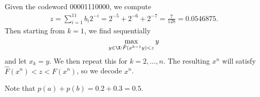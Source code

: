 \documentclass[
  coursecode={MTHE 477},
  assignmentname={Homework \homeworknumber},
  studentnumber=20053722,
  name={Bryan Hoang},
  draft,
  final,
]{
  ltxanswer%
}
\begin{document}
\begin{questions}
\begin{parts}
      \part{}
      \begin{solution}
        Given the codeword 00001110000, we compute
        \begin{align*}
          z = \sum_{i=1}^{11} b_{i} 2^{-i} = 2^{-5} + 2^{-6} + 2^{-7} = \frac{7}{128} = 0.0546875.
        \end{align*}
        Then starting from \(k = 1\), we find sequentially
        \begin{equation*}
          \max_{y \in \X : \hat{F}(x^{k-1}y) < z} y
        \end{equation*}
        and let \(x_{k} = y\). We then repeat this for \(k = 2, \dotsc, n\). The resulting \(x^{n}\) will satisfy \(\hat{F}(x^{n}) < z < F(x^{n})\), so we decode \(x^{n}\).

        Note that \(p(a) + p(b) = 0.2 + 0.3 = 0.5\).


\end{solution}
\end{parts}
\end{questions}
\end{document}

